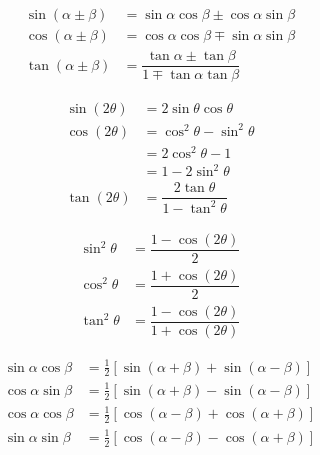 \begin{proposition}\label{prop:A-3}
\begin{align*}
  \sin(\alpha \pm \beta) &= \sin\alpha\cos\beta \pm \cos\alpha\sin\beta \\
  \cos(\alpha \pm \beta) &= \cos\alpha\cos\beta \mp \sin\alpha\sin\beta \\
  \tan(\alpha \pm \beta) &= \dfrac{\tan\alpha \pm \tan\beta}
                                  {1 \mp \tan\alpha\tan\beta}
\end{align*}
\end{proposition}

\begin{proposition}\label{prop:A-4}
\begin{align*}
  \sin(2\theta) &= 2\sin\theta\cos\theta \\
  \cos(2\theta) &= \cos^2\theta - \sin^2\theta \\
                &= 2\cos^2\theta - 1 \\
                &= 1 - 2\sin^2\theta \\
  \tan(2\theta) &= \dfrac{2\tan\theta}{1 - \tan^2\theta}
\end{align*}
\end{proposition}

\begin{proposition}\label{prop:A-5}
\begin{align*}
  \sin^2\theta &= \dfrac{1 - \cos(2\theta)}{2} \\
  \cos^2\theta &= \dfrac{1 + \cos(2\theta)}{2} \\
  \tan^2\theta &= \dfrac{1 - \cos(2\theta)}{1 + \cos(2\theta)}
\end{align*}
\end{proposition}

\begin{proposition}\label{prop:A-6}
\begin{align*}
  \sin\alpha\cos\beta &= \tfrac{1}{2}[\sin(\alpha+\beta)+\sin(\alpha-\beta)] \\
  \cos\alpha\sin\beta &= \tfrac{1}{2}[\sin(\alpha+\beta)-\sin(\alpha-\beta)] \\
  \cos\alpha\cos\beta &= \tfrac{1}{2}[\cos(\alpha-\beta)+\cos(\alpha+\beta)] \\
  \sin\alpha\sin\beta &= \tfrac{1}{2}[\cos(\alpha-\beta)-\cos(\alpha+\beta)]
\end{align*}
\end{proposition}

